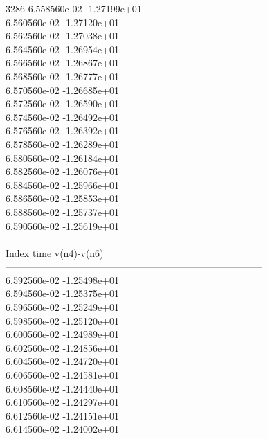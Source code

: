 3286	6.558560e-02	-1.27199e+01	\\ 	6.560560e-02	-1.27120e+01	\\ 	6.562560e-02	-1.27038e+01	\\ 	6.564560e-02	-1.26954e+01	\\ 	6.566560e-02	-1.26867e+01	\\ 	6.568560e-02	-1.26777e+01	\\ 	6.570560e-02	-1.26685e+01	\\ 	6.572560e-02	-1.26590e+01	\\ 	6.574560e-02	-1.26492e+01	\\ 	6.576560e-02	-1.26392e+01	\\ 	6.578560e-02	-1.26289e+01	\\ 	6.580560e-02	-1.26184e+01	\\ 	6.582560e-02	-1.26076e+01	\\ 	6.584560e-02	-1.25966e+01	\\ 	6.586560e-02	-1.25853e+01	\\ 	6.588560e-02	-1.25737e+01	\\ 	6.590560e-02	-1.25619e+01	\\ \hline
\\ \hline
Index   time            v(n4)-v(n6)     \\ \hline
--------------------------------------------------------------------------------\\ 	6.592560e-02	-1.25498e+01	\\ 	6.594560e-02	-1.25375e+01	\\ 	6.596560e-02	-1.25249e+01	\\ 	6.598560e-02	-1.25120e+01	\\ 	6.600560e-02	-1.24989e+01	\\ 	6.602560e-02	-1.24856e+01	\\ 	6.604560e-02	-1.24720e+01	\\ 	6.606560e-02	-1.24581e+01	\\ 	6.608560e-02	-1.24440e+01	\\ 	6.610560e-02	-1.24297e+01	\\ 	6.612560e-02	-1.24151e+01	\\ 	6.614560e-02	-1.24002e+01	\\ \hline
